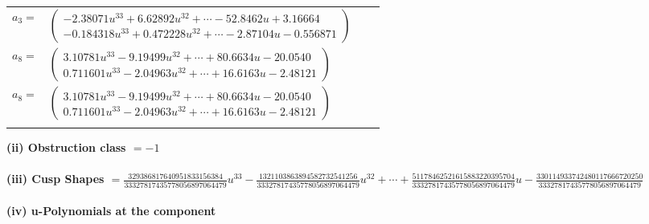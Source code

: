 \documentclass[1p]{elsarticle_modified}
\theoremstyle{definition}
\begin{document}
\begin{tabular}{m{7pt} m{180pt} m{7pt} m{180pt} }
\flushright $a_{3}=$&$\begin{pmatrix}-2.38071 u^{33}+6.62892 u^{32}+\cdots-52.8462 u+3.16664\\-0.184318 u^{33}+0.472228 u^{32}+\cdots-2.87104 u-0.556871\end{pmatrix}$ \\
\flushright $a_{8}=$&$\begin{pmatrix}3.10781 u^{33}-9.19499 u^{32}+\cdots+80.6634 u-20.0540\\0.711601 u^{33}-2.04963 u^{32}+\cdots+16.6163 u-2.48121\end{pmatrix}$\\ \flushright $a_{8}=$&$\begin{pmatrix}3.10781 u^{33}-9.19499 u^{32}+\cdots+80.6634 u-20.0540\\0.711601 u^{33}-2.04963 u^{32}+\cdots+16.6163 u-2.48121\end{pmatrix}$\\&\end{tabular}
\flushleft \textbf{(ii) Obstruction class $= -1$}\\~\\
\flushleft \textbf{(iii) Cusp Shapes $= \frac{329386817640951833156384}{33327817435778056897064479} u^{33}-\frac{1321103863894582732541256}{33327817435778056897064479} u^{32}+\cdots+\frac{51178462521615883220395704}{33327817435778056897064479} u-\frac{330114933742480117666720250}{33327817435778056897064479}$}\\~\\
\newpage\renewcommand{\arraystretch}{1}
\flushleft \textbf{(iv) u-Polynomials at the component}\newline \\
\end{document}
